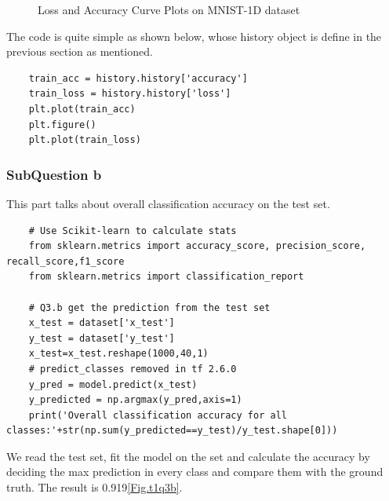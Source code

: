 \documentclass[conference]{IEEEtran}
\begin{document}
\begin{figure}[h]
\centering  %

\caption{Loss and Accuracy Curve Plots on MNIST-1D dataset}
\label{Fig.la}
\end{figure}

The code is quite simple as shown below, whose history object is define in the previous section as mentioned. 

\begin{lstlisting}
    train_acc = history.history['accuracy']
    train_loss = history.history['loss']
    plt.plot(train_acc)
    plt.figure()
    plt.plot(train_loss)
\end{lstlisting}

\subsubsection{SubQuestion b}
This part talks about overall classification accuracy on the test set.
\begin{lstlisting}
    # Use Scikit-learn to calculate stats
    from sklearn.metrics import accuracy_score, precision_score, recall_score,f1_score
    from sklearn.metrics import classification_report

    # Q3.b get the prediction from the test set
    x_test = dataset['x_test']
    y_test = dataset['y_test']
    x_test=x_test.reshape(1000,40,1)
    # predict_classes removed in tf 2.6.0
    y_pred = model.predict(x_test)
    y_predicted = np.argmax(y_pred,axis=1)
    print('Overall classification accuracy for all classes:'+str(np.sum(y_predicted==y_test)/y_test.shape[0]))
\end{lstlisting}
We read the test set, fit the model on the set and calculate the accuracy by deciding the max prediction in every class and compare them with the ground truth. The result is 0.919\ref{Fig.t1q3b}.
\end{document}
